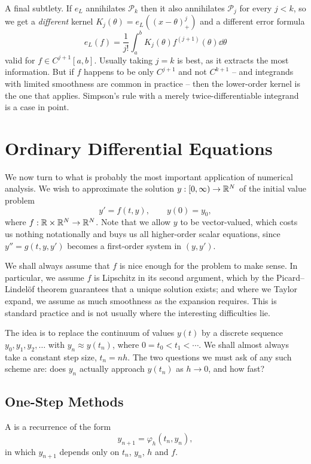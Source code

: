 \documentclass[a4paper]{scrartcl}
\newcommand{\Pn}[1]{\mathcal{P}_{#1}}
\begin{document}
\begin{remark}
  A final subtlety. If $e_L$ annihilates $\Pn{k}$ then it also annihilates $\Pn{j}$ for every $j < k$, so we get a \emph{different} kernel $K_j(\theta) = e_L((x-\theta)_+^j)$ and a different error formula
  $$
  e_L(f) = \frac{1}{j!}\int_a^b K_j(\theta)f^{(j+1)}(\theta)\dd\theta
  $$
  valid for $f \in C^{j+1}[a,b]$. Usually taking $j = k$ is best, as it extracts the most information. But if $f$ happens to be only $C^{j+1}$ and not $C^{k+1}$ -- and integrands with limited smoothness are common in practice -- then the lower-order kernel is the one that applies. Simpson's rule with a merely twice-differentiable integrand is a case in point.
\end{remark}


\section{Ordinary Differential Equations}

We now turn to what is probably the most important application of numerical analysis. We wish to approximate the solution $y: [0, \infty) \to \mathbb{R}^N$ of the initial value problem
$$
y' = f(t, y), \qquad y(0) = y_0,
$$
where $f: \mathbb{R} \times \mathbb{R}^N \to \mathbb{R}^N$. Note that we allow $y$ to be vector-valued, which costs us nothing notationally and buys us all higher-order scalar equations, since $y'' = g(t,y,y')$ becomes a first-order system in $(y, y')$.

We shall always assume that $f$ is nice enough for the problem to make sense. In particular, we assume $f$ is Lipschitz in its second argument, which by the Picard--Lindelöf theorem guarantees that a unique solution exists; and where we Taylor expand, we assume as much smoothness as the expansion requires. This is standard practice and is not usually where the interesting difficulties lie.

The idea is to replace the continuum of values $y(t)$ by a discrete sequence $y_0, y_1, y_2, \dots$ with $y_n \approx y(t_n)$, where $0 = t_0 < t_1 < \cdots$. We shall almost always take a constant step size, $t_n = nh$. The two questions we must ask of any such scheme are: does $y_n$ actually approach $y(t_n)$ as $h \to 0$, and how fast?

\subsection{One-Step Methods}

\begin{definition}
  A  is a recurrence of the form
  $$
  y_{n+1} = \varphi_h(t_n, y_n),
  $$
  in which $y_{n+1}$ depends only on $t_n$, $y_n$, $h$ and $f$.
\end{definition}
\end{document}
